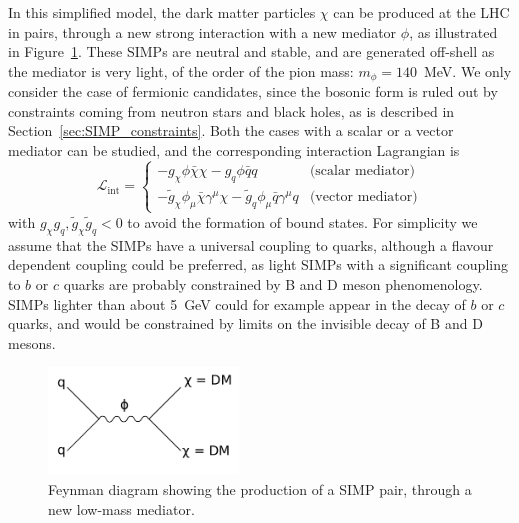 In this simplified model, the dark matter particles $\chi$ can be produced at the \ac{LHC} in pairs, through a new strong interaction with a new mediator $\phi$, as illustrated in Figure~\ref{fig:diagram}. These \acp{SIMP} are neutral and stable, and are generated off-shell as the mediator is very light, of the order of the pion mass: $m_{\phi} = 140$~MeV. We only consider the case of fermionic candidates, since the bosonic form is ruled out by constraints coming from neutron stars and black holes, as is described in Section~\ref{sec:SIMP_constraints}. Both the cases with a scalar or a vector mediator can be studied, and the corresponding interaction Lagrangian is
\begin{equation} \label{eq:SIMP_lagrangian}
 \mathcal{L}_{\mathrm{int}} = 
 \begin{cases}
  -g_{\chi}\phi\bar{\chi}\chi - g_q\phi\bar{q}q & \text{(scalar mediator)}\\
  -\tilde{g}_{\chi}\phi_{\mu}\bar{\chi}\gamma^{\mu}\chi - \tilde{g}_q\phi_{\mu}\bar{q}\gamma^{\mu}q & \text{(vector mediator)}
 \end{cases}
\end{equation}
with $g_{\chi}g_q,\tilde{g}_{\chi}\tilde{g}_q <0$ to avoid the formation of bound states. For simplicity we assume that the \acp{SIMP} have a universal coupling to quarks, although a flavour dependent coupling could be preferred, as light \acp{SIMP} with a significant coupling to $b$ or $c$ quarks are probably constrained by B and D meson phenomenology. \acp{SIMP} lighter than about 5~GeV could for example appear in the decay of $b$ or $c$ quarks, and would be constrained by limits on the invisible decay of B and D mesons.

\begin{figure}[ht]
  \centering
  \includegraphics[width=0.45\textwidth]{diagram.pdf}\hfill%
  \caption{Feynman diagram showing the production of a SIMP pair, through a new low-mass mediator.}
  \label{fig:diagram}
\end{figure}


